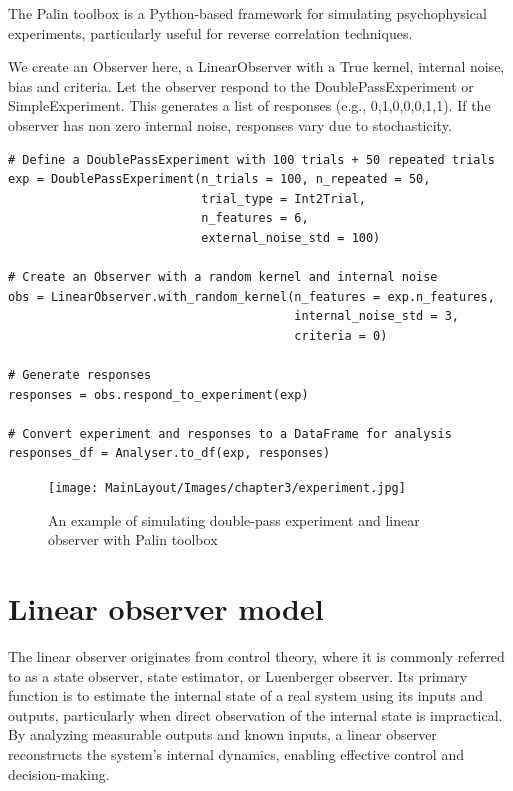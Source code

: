 \begin{tcolorbox}[title=Palin Toolbox: Simulate experiment and linear observer,
    colback=white!30!white, colframe=blue!80!white]
The Palin toolbox is a Python-based framework for simulating psychophysical experiments, particularly useful for reverse correlation techniques. 

We create an Observer here, a LinearObserver with a True kernel, internal noise, bias and criteria. Let the observer respond to the DoublePassExperiment or SimpleExperiment.
This generates a list of responses (e.g., 0,1,0,0,0,1,1). 
If the observer has non zero internal noise, responses vary due to stochasticity.

\tcblower

\begin{verbatim}
# Define a DoublePassExperiment with 100 trials + 50 repeated trials
exp = DoublePassExperiment(n_trials = 100, n_repeated = 50, 
                           trial_type = Int2Trial, 
                           n_features = 6, 
                           external_noise_std = 100)

# Create an Observer with a random kernel and internal noise
obs = LinearObserver.with_random_kernel(n_features = exp.n_features,
                                        internal_noise_std = 3, 
                                        criteria = 0)

# Generate responses
responses = obs.respond_to_experiment(exp)

# Convert experiment and responses to a DataFrame for analysis
responses_df = Analyser.to_df(exp, responses)

\end{verbatim}

\end{tcolorbox}


\begin{figure}[ht!]
    \centering
    \texttt{[image: MainLayout/Images/chapter3/experiment.jpg]}
    \caption{\small An example of simulating double-pass experiment and linear observer with Palin toolbox}
    \label{fig:experiment}
\end{figure}


\section {Linear observer model} 
The linear observer originates from control theory, where it is commonly referred to as a state observer, state estimator, or Luenberger observer. Its primary function is to estimate the internal state of a real system using its inputs and outputs, particularly when direct observation of the internal state is impractical. By analyzing measurable outputs and known inputs, a linear observer reconstructs the system’s internal dynamics, enabling effective control and decision-making.

